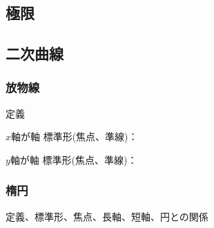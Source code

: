 \documentclass[10pt,dvipdfmx]{jsarticle}
\begin{document}
\subsection*{極限}

\newpage
\subsection*{二次曲線}
\subsubsection*{放物線}
\begin{itembox}[l]{定義}
  \vspace{8mm}
\end{itembox}

\begin{multicols}{2}
  \begin{minipage}{0.45\textwidth}
    \begin{itembox}[l]{$x$軸が軸}
      標準形(焦点、準線)：\\
      \begin{center}
      \end{center}
    \end{itembox}

  \end{minipage}
  \begin{minipage}{0.45\textwidth}
    \begin{itembox}[l]{$y$軸が軸}
      標準形(焦点、準線)：\\
      \begin{center}
      \end{center}

    \end{itembox}
  \end{minipage}
\end{multicols}


\subsubsection*{楕円}
\begin{itembox}[l]{定義、標準形、焦点、長軸、短軸、円との関係}
  \vspace{20mm}
\end{itembox}
\end{document}
